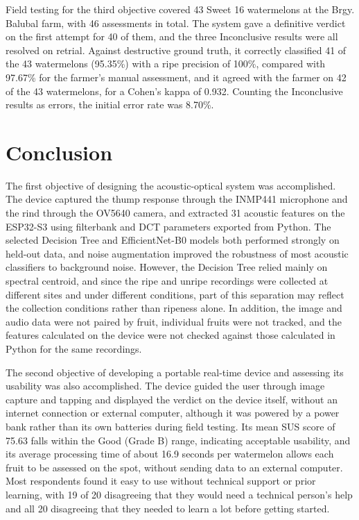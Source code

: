 \begin{thesisprose}
Field testing for the third objective covered 43 Sweet 16 watermelons at the Brgy. Balubal farm, with 46 assessments in total. The system gave a definitive verdict on the first attempt for 40 of them, and the three Inconclusive results were all resolved on retrial. Against destructive ground truth, it correctly classified 41 of the 43 watermelons (95.35\%) with a ripe precision of 100\%, compared with 97.67\% for the farmer's manual assessment, and it agreed with the farmer on 42 of the 43 watermelons, for a Cohen's kappa of 0.932. Counting the Inconclusive results as errors, the initial error rate was 8.70\%.

\section{Conclusion}

The first objective of designing the acoustic-optical system was accomplished. The device captured the thump response through the INMP441 microphone and the rind through the OV5640 camera, and extracted 31 acoustic features on the ESP32-S3 using filterbank and DCT parameters exported from Python. The selected Decision Tree and EfficientNet-B0 models both performed strongly on held-out data, and noise augmentation improved the robustness of most acoustic classifiers to background noise. However, the Decision Tree relied mainly on spectral centroid, and since the ripe and unripe recordings were collected at different sites and under different conditions, part of this separation may reflect the collection conditions rather than ripeness alone. In addition, the image and audio data were not paired by fruit, individual fruits were not tracked, and the features calculated on the device were not checked against those calculated in Python for the same recordings.

The second objective of developing a portable real-time device and assessing its usability was also accomplished. The device guided the user through image capture and tapping and displayed the verdict on the device itself, without an internet connection or external computer, although it was powered by a power bank rather than its own batteries during field testing. Its mean SUS score of 75.63 falls within the Good (Grade B) range, indicating acceptable usability, and its average processing time of about 16.9 seconds per watermelon allows each fruit to be assessed on the spot, without sending data to an external computer. Most respondents found it easy to use without technical support or prior learning, with 19 of 20 disagreeing that they would need a technical person's help and all 20 disagreeing that they needed to learn a lot before getting started.


\end{thesisprose}
